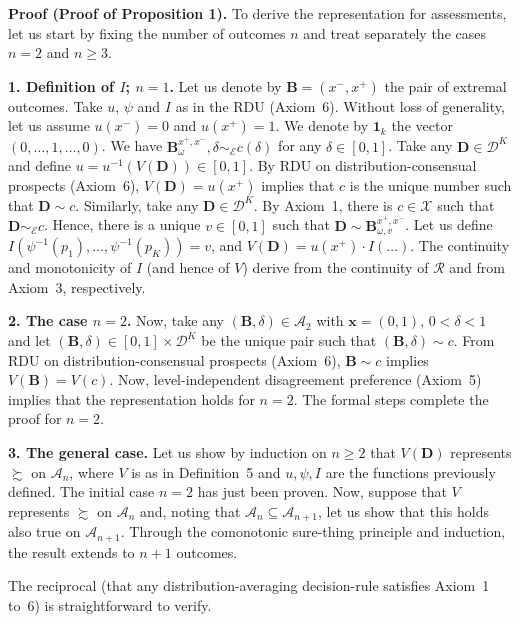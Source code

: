 \documentclass[12pt,a4paper]{article}
\newenvironment{original}
  {\par\noindent\ignorespaces}
  {\par}
\begin{document}
\begin{original}
\textbf{Proof (Proof of Proposition 1).} To derive the representation for assessments, let us start by fixing the number of outcomes $n$ and treat separately the cases $n=2$ and $n \geq 3$.

\textbf{1. Definition of $I$; $n=1$.} Let us denote by $\mathbf{B} = (x^{-}, x^{+})$ the pair of extremal outcomes. Take $u$, $\psi$ and $I$ as in the RDU (Axiom~6). Without loss of generality, let us assume $u(x^{-}) = 0$ and $u(x^{+}) = 1$. We denote by $\mathbf{1}_{k}$ the vector $(0, \dots, 1, \dots, 0)$. We have $\mathbf{B}^{x^{+},x^{-}}_{\omega}, \delta \sim_{\mathcal{E}} c(\delta)$ for any $\delta \in [0,1]$. Take any $\mathbf{D} \in \mathcal{D}^{K}$ and define $u = u^{-1}(V(\mathbf{D})) \in [0,1]$. By RDU on distribution-consensual prospects (Axiom~6), $V(\mathbf{D}) = u(x^{+})$ implies that $c$ is the unique number such that $\mathbf{D} \sim c$. Similarly, take any $\mathbf{D} \in \mathcal{D}^{K}$. By Axiom~1, there is $c \in \mathcal{X}$ such that $\mathbf{D} \sim_{\mathcal{E}} c$. Hence, there is a unique $v \in [0,1]$ such that $\mathbf{D} \sim \mathbf{B}^{x^{+},x^{-}}_{\omega, v}$. Let us define $I(\psi^{-1}(p_{1}), \dots, \psi^{-1}(p_{K})) = v$, and $V(\mathbf{D}) = u(x^{+}) \cdot I(\dots)$. The continuity and monotonicity of $I$ (and hence of $V$) derive from the continuity of $\mathcal{R}$ and from Axiom~3, respectively.

\textbf{2. The case $n=2$.} Now, take any $(\mathbf{B}, \delta) \in \mathcal{A}_{2}$ with $\mathbf{x} = (0, 1)$, $0 < \delta < 1$ and let $(\mathbf{B}, \delta) \in [0,1] \times \mathcal{D}^{K}$ be the unique pair such that $(\mathbf{B}, \delta) \sim c$. From RDU on distribution-consensual prospects (Axiom~6), $\mathbf{B} \sim c$ implies $V(\mathbf{B}) = V(c)$. Now, level-independent disagreement preference (Axiom~5) implies that the representation holds for $n=2$. The formal steps complete the proof for $n=2$.

\textbf{3. The general case.} Let us show by induction on $n \geq 2$ that $V(\mathbf{D})$ represents $\succsim$ on $\mathcal{A}_{n}$, where $V$ is as in Definition~5 and $u, \psi, I$ are the functions previously defined. The initial case $n=2$ has just been proven. Now, suppose that $V$ represents $\succsim$ on $\mathcal{A}_{n}$ and, noting that $\mathcal{A}_{n} \subseteq \mathcal{A}_{n+1}$, let us show that this holds also true on $\mathcal{A}_{n+1}$. Through the comonotonic sure-thing principle and induction, the result extends to $n+1$ outcomes.

The reciprocal (that any distribution-averaging decision-rule satisfies Axiom~1 to~6) is straightforward to verify.
\end{original}
\end{document}
